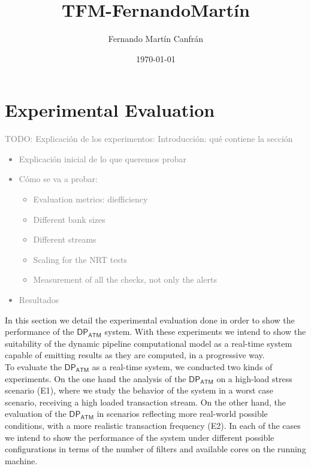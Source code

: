 \documentclass[12pt,a4paper]{article}
\title{TFM-FernandoMartín}
\author{Fernando Martín Canfrán}
\date{\today}
\newcommand{\DPATM}{$\mathsf{DP_{ATM}}$ }
\begin{document}
\maketitle

\newpage
\section{Experimental Evaluation}

\textcolor{gray}{TODO: Explicación de los experimentos:
Introducción: qué contiene la sección
\begin{itemize}
    \item Explicación inicial de lo que queremos probar
    \item Cómo se va a probar:
    \begin{itemize}
        \item Evaluation metrics: diefficiency
        \item Different bank sizes
        \item Different streams
        \item Scaling for the NRT tests
        \item Measurement of all the checks, not only the alerts
    \end{itemize}
    \item Resultados
\end{itemize}
}

In this section we detail the experimental evaluation done in order to show the performance of the \DPATM system. With these experiments we intend to show the suitability of the dynamic pipeline computational model as a real-time system capable of emitting results as they are computed, in a progressive way.\\

To evaluate the \DPATM as a real-time system, we conducted two kinds of experiments. On the one hand the analysis of the \DPATM on a high-load stress scenario (E1), where we study the behavior of the system in a worst case scenario, receiving a high loaded transaction stream. On the other hand, the evaluation of the \DPATM in scenarios reflecting more real-world possible conditions, with a more realistic transaction frequency (E2). In each of the cases we intend to show the performance of the system under different possible configurations in terms of the number of filters and available cores on the running machine.\\
\end{document}
